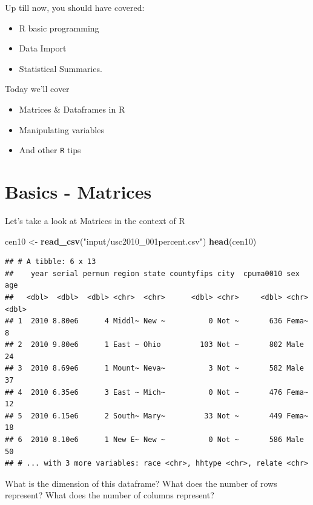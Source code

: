 \documentclass[]{book}
\newenvironment{Shaded}{\begin{snugshade}}{\end{snugshade}}
\newcommand{\KeywordTok}[1]{\textcolor[rgb]{0.13,0.29,0.53}{\textbf{#1}}}
\newcommand{\NormalTok}[1]{#1}
\newcommand{\StringTok}[1]{\textcolor[rgb]{0.31,0.60,0.02}{#1}}
\providecommand{\tightlist}{%
  \setlength{\itemsep}{0pt}\setlength{\parskip}{0pt}}
\theoremstyle{definition}
\theoremstyle{definition}
\theoremstyle{definition}
\theoremstyle{remark}
\begin{document}
Up till now, you should have covered:

\begin{itemize}
\tightlist
\item
  R basic programming
\item
  Data Import
\item
  Statistical Summaries.
\end{itemize}

Today we'll cover

\begin{itemize}
\tightlist
\item
  Matrices \& Dataframes in R
\item
  Manipulating variables
\item
  And other \texttt{R} tips
\end{itemize}

\hypertarget{basics---matrices}{%
\section{Basics - Matrices}\label{basics---matrices}}

Let's take a look at Matrices in the context of R

\begin{Shaded}
\begin{Highlighting}[]
\NormalTok{cen10 <-}\StringTok{ }\KeywordTok{read_csv}\NormalTok{(}\StringTok{"input/usc2010_001percent.csv"}\NormalTok{)}
\KeywordTok{head}\NormalTok{(cen10)}
\end{Highlighting}
\end{Shaded}

\begin{verbatim}
## # A tibble: 6 x 13
##    year serial pernum region state countyfips city  cpuma0010 sex     age
##   <dbl>  <dbl>  <dbl> <chr>  <chr>      <dbl> <chr>     <dbl> <chr> <dbl>
## 1  2010 8.80e6      4 Middl~ New ~          0 Not ~       636 Fema~     8
## 2  2010 9.80e6      1 East ~ Ohio         103 Not ~       802 Male     24
## 3  2010 8.69e6      1 Mount~ Neva~          3 Not ~       582 Male     37
## 4  2010 6.35e6      3 East ~ Mich~          0 Not ~       476 Fema~    12
## 5  2010 6.15e6      2 South~ Mary~         33 Not ~       449 Fema~    18
## 6  2010 8.10e6      1 New E~ New ~          0 Not ~       586 Male     50
## # ... with 3 more variables: race <chr>, hhtype <chr>, relate <chr>
\end{verbatim}

What is the dimension of this dataframe? What does the number of rows represent? What does the number of columns represent?
\end{document}
